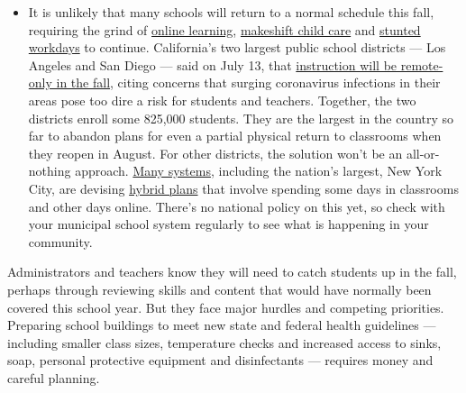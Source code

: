 \begin{itemize}
  \begin{itemize}
  \tightlist
  \item
    It is unlikely that many schools will return to a normal schedule
    this fall, requiring the grind of
    \href{https://www.nytimes.com/2020/06/05/us/coronavirus-education-lost-learning.html?action=click\&pgtype=Article\&state=default\&region=MAIN_CONTENT_3\&context=storylines_faq}{online
    learning},
    \href{https://www.nytimes.com/2020/05/29/us/coronavirus-child-care-centers.html?action=click\&pgtype=Article\&state=default\&region=MAIN_CONTENT_3\&context=storylines_faq}{makeshift
    child care} and
    \href{https://www.nytimes.com/2020/06/03/business/economy/coronavirus-working-women.html?action=click\&pgtype=Article\&state=default\&region=MAIN_CONTENT_3\&context=storylines_faq}{stunted
    workdays} to continue. California's two largest public school
    districts --- Los Angeles and San Diego --- said on July 13, that
    \href{https://www.nytimes.com/2020/07/13/us/lausd-san-diego-school-reopening.html?action=click\&pgtype=Article\&state=default\&region=MAIN_CONTENT_3\&context=storylines_faq}{instruction
    will be remote-only in the fall}, citing concerns that surging
    coronavirus infections in their areas pose too dire a risk for
    students and teachers. Together, the two districts enroll some
    825,000 students. They are the largest in the country so far to
    abandon plans for even a partial physical return to classrooms when
    they reopen in August. For other districts, the solution won't be an
    all-or-nothing approach.
    \href{https://bioethics.jhu.edu/research-and-outreach/projects/eschool-initiative/school-policy-tracker/}{Many
    systems}, including the nation's largest, New York City, are
    devising
    \href{https://www.nytimes.com/2020/06/26/us/coronavirus-schools-reopen-fall.html?action=click\&pgtype=Article\&state=default\&region=MAIN_CONTENT_3\&context=storylines_faq}{hybrid
    plans} that involve spending some days in classrooms and other days
    online. There's no national policy on this yet, so check with your
    municipal school system regularly to see what is happening in your
    community.
  \end{itemize}
\end{itemize}

Administrators and teachers know they will need to catch students up in
the fall, perhaps through reviewing skills and content that would have
normally been covered this school year. But they face major hurdles and
competing priorities. Preparing school buildings to meet new state and
federal health guidelines --- including smaller class sizes, temperature
checks and increased access to sinks, soap, personal protective
equipment and disinfectants --- requires money and careful planning.

